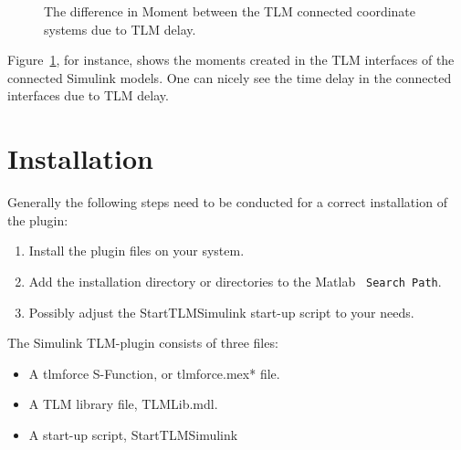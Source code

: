 \begin{figure}[ht]
\centering
{}
\caption{The difference in Moment between the TLM connected coordinate
	systems due to TLM delay.}
\label{fig:MomentShafts}
\end{figure}

Figure~\ref{fig:MomentShafts}, for instance, shows the moments created
in the TLM interfaces of the connected Simulink models. One can nicely
see the time delay in the connected interfaces due to TLM delay.

\section{Installation}
Generally the following steps need to be conducted for a correct
installation of the plugin:
\begin{enumerate}
\item Install the plugin files on your system.
\item Add the installation directory or directories to the Matlab {\tt
Search Path}.
\item Possibly adjust the StartTLMSimulink start-up script to your needs.
\end{enumerate}

The Simulink TLM-plugin consists of three files:
\begin{itemize}
\item A tlmforce S-Function, or tlmforce.mex* file.
\item A TLM library file, TLMLib.mdl.
\item A start-up script, StartTLMSimulink
\end{itemize}

